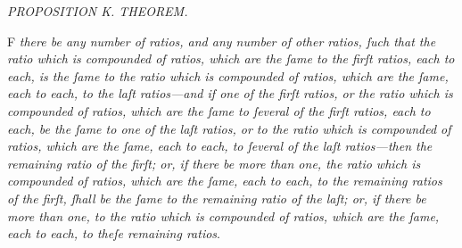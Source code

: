 \documentclass[12pt,preview]{standalone}
\begin{document}
\begin{minipage}{\textwidth}

    \begin{center}
        \textit{PROPOSITION K. THEOREM.}\label{book5prK} \\
    \end{center}

    \begin{center}
        \raggedright \lettrine[lines=4, loversize=1, nindent=0pt]{}{}F \textit{there be any number of ratios, and any number of other ratios, ſuch that the ratio which is compounded of ratios, which are the ſame to the firſt ratios, each to each, is the ſame to the ratio which is compounded of ratios, which are the ſame, each to each, to the laſt ratios—and if one of the firſt ratios, or the ratio which is compounded of ratios, which are the ſame to ſeveral of the firſt ratios, each to each, be the ſame to one of the laſt ratios, or to the ratio which is compounded of ratios, which are the ſame, each to each, to ſeveral of the laſt ratios—then the remaining ratio of the firſt; or, if there be more than one, the ratio which is compounded of ratios, which are the ſame, each to each, to the remaining ratios of the firſt, ſhall be the ſame to the remaining ratio of the laſt; or, if there be more than one, to the ratio which is compounded of ratios, which are the ſame, each to each, to theſe remaining ratios}.
    \end{center}

    \hfill

    \hfill

    \begin{center}
    \end{center}

    \hfill

    \hfill


\end{minipage}
\end{document}
